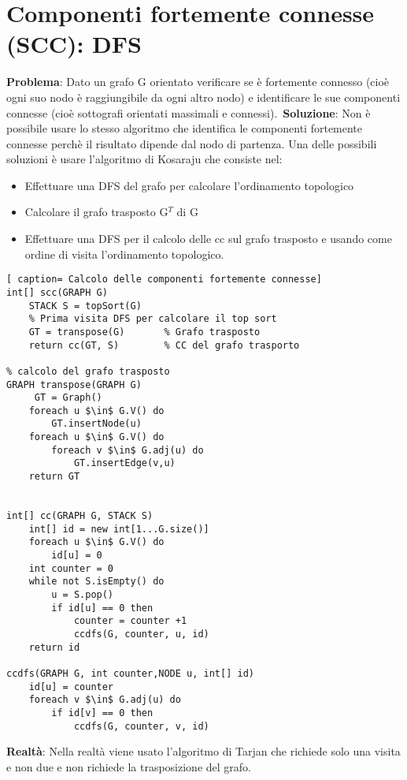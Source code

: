 \documentclass[../cheatSheetAlgoritmi.tex]{subfiles}
\begin{document}
\section{Componenti fortemente connesse (SCC): DFS}
\textbf{Problema}: Dato un grafo G orientato verificare se è fortemente connesso (cioè  ogni suo nodo è raggiungibile da ogni altro nodo) e identificare le sue componenti connesse (cioè sottografi orientati massimali e connessi).\
\textbf{Soluzione}: Non è possibile usare lo stesso algoritmo che identifica le componenti fortemente connesse perchè il risultato dipende dal nodo di partenza. Una delle possibili soluzioni è usare l'algoritmo di Kosaraju che consiste nel:
\begin{itemize}
	\item Effettuare una DFS del grafo per calcolare l'ordinamento topologico
	\item Calcolare il grafo trasposto G$^{T}$ di G
	\item Effettuare una DFS per il calcolo delle cc sul grafo trasposto e usando come ordine di visita l'ordinamento topologico. 
\end{itemize} 
\newpage
\begin{lstlisting}[ caption= Calcolo delle componenti fortemente connesse]
int[] scc(GRAPH G)
	STACK S = topSort(G) 	
	% Prima visita DFS per calcolare il top sort
	GT = transpose(G)		% Grafo trasposto
	return cc(GT, S)		% CC del grafo trasporto
	
% calcolo del grafo trasposto
GRAPH transpose(GRAPH G)
	 GT = Graph()
	foreach u $\in$ G.V() do
		GT.insertNode(u)
	foreach u $\in$ G.V() do
		foreach v $\in$ G.adj(u) do
			GT.insertEdge(v,u)
	return GT


int[] cc(GRAPH G, STACK S)
	int[] id = new int[1...G.size()]
	foreach u $\in$ G.V() do
		id[u] = 0
	int counter = 0
	while not S.isEmpty() do
		u = S.pop()
		if id[u] == 0 then
			counter = counter +1
			ccdfs(G, counter, u, id)
	return id
	
ccdfs(GRAPH G, int counter,NODE u, int[] id)
	id[u] = counter
	foreach v $\in$ G.adj(u) do
		if id[v] == 0 then
			ccdfs(G, counter, v, id)
\end{lstlisting}
\textbf{Realtà}: Nella realtà viene usato l'algoritmo di Tarjan che richiede solo una visita e non due e non richiede la trasposizione del grafo.

\newpage
\end{document}

